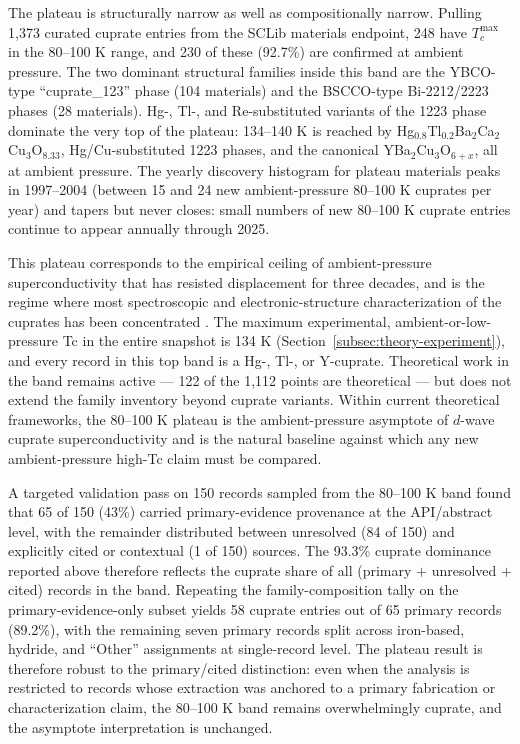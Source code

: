 \documentclass[11pt]{article}
\begin{document}
The plateau is structurally narrow as well as compositionally narrow. Pulling 1{,}373 curated cuprate entries from the SCLib materials endpoint, 248 have $T_c^{\mathrm{max}}$ in the 80--100 K range, and 230 of these (92.7\%) are confirmed at ambient pressure. The two dominant structural families inside this band are the YBCO-type ``cuprate\_123'' phase (104 materials) and the BSCCO-type Bi-2212/2223 phases (28 materials). Hg-, Tl-, and Re-substituted variants of the 1223 phase dominate the very top of the plateau: 134--140 K is reached by Hg$_{0.8}$Tl$_{0.2}$Ba$_2$Ca$_2$Cu$_3$O$_{8.33}$, Hg/Cu-substituted 1223 phases, and the canonical YBa$_2$Cu$_3$O$_{6+x}$, all at ambient pressure. The yearly discovery histogram for plateau materials peaks in 1997--2004 (between 15 and 24 new ambient-pressure 80--100 K cuprates per year) and tapers but never closes: small numbers of new 80--100 K cuprate entries continue to appear annually through 2025.

This plateau corresponds to the empirical ceiling of ambient-pressure superconductivity that has resisted displacement for three decades, and is the regime where most spectroscopic and electronic-structure characterization of the cuprates has been concentrated \cite{damascelli2003arpes,keimer2015cupratereview}. The maximum experimental, ambient-or-low-pressure Tc in the entire snapshot is 134 K (Section~\ref{subsec:theory-experiment}), and every record in this top band is a Hg-, Tl-, or Y-cuprate. Theoretical work in the band remains active --- 122 of the 1{,}112 points are theoretical --- but does not extend the family inventory beyond cuprate variants. Within current theoretical frameworks, the 80--100 K plateau is the ambient-pressure asymptote of $d$-wave cuprate superconductivity and is the natural baseline against which any new ambient-pressure high-Tc claim must be compared.

A targeted validation pass on 150 records sampled from the 80--100 K band found that 65 of 150 (43\%) carried primary-evidence provenance at the API/abstract level, with the remainder distributed between unresolved (84 of 150) and explicitly cited or contextual (1 of 150) sources. The 93.3\% cuprate dominance reported above therefore reflects the cuprate share of all (primary $+$ unresolved $+$ cited) records in the band. Repeating the family-composition tally on the primary-evidence-only subset yields 58 cuprate entries out of 65 primary records (89.2\%), with the remaining seven primary records split across iron-based, hydride, and ``Other'' assignments at single-record level. The plateau result is therefore robust to the primary/cited distinction: even when the analysis is restricted to records whose extraction was anchored to a primary fabrication or characterization claim, the 80--100 K band remains overwhelmingly cuprate, and the asymptote interpretation is unchanged.
\end{document}
